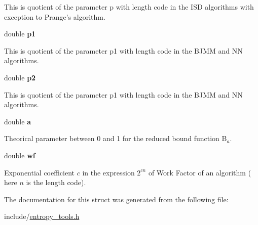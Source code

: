 \begin{description}
\-This is quotient of the parameter p with length code in the ISD algorithms with exception to Prange's algorithm. 

\hypertarget{structwf__params_afe3ec2bbc515ef1c2c03dccf567831f4}{
\item[ ]{\setlength{\rightskip}{0pt plus 5cm}double {\bf p1}}}\label{structwf__params_afe3ec2bbc515ef1c2c03dccf567831f4}

\-This is quotient of the parameter p1 with length code in the BJMM and NN algorithms. 

\hypertarget{structwf__params_afb3d783e05c27da8ea3c53c9d2e17af1}{
\item[ ]{\setlength{\rightskip}{0pt plus 5cm}double {\bf p2}}}\label{structwf__params_afb3d783e05c27da8ea3c53c9d2e17af1}

\-This is quotient of the parameter p1 with length code in the BJMM and NN algorithms. 

\hypertarget{structwf__params_a1031d0e0a97a340abfe0a6ab9e831045}{
\item[ ]{\setlength{\rightskip}{0pt plus 5cm}double {\bf a}}}\label{structwf__params_a1031d0e0a97a340abfe0a6ab9e831045}

\-Theorical parameter between 0 and 1 for the reduced bound function B$_a$. 

\hypertarget{structwf__params_a3d48e7e4501d1f62ef751e2643e37c51}{
\item[ ]{\setlength{\rightskip}{0pt plus 5cm}double {\bf wf}}}\label{structwf__params_a3d48e7e4501d1f62ef751e2643e37c51}

\-Exponential coefficient $c$ in the expression $2^{c n }$ of Work Factor of an algorithm ( here $n$ is the length code).

\end{description}

\-The documentation for this struct was generated from the following file\-:\begin{DoxyCompactItemize}
\item 
include/\hyperlink{entropy__tools_8h}{entropy\-\_\-tools.\-h}\end{DoxyCompactItemize}